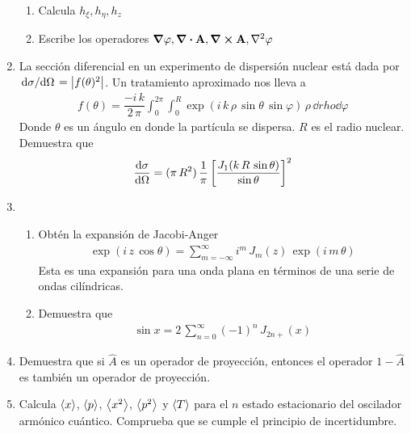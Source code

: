 \begin{enumerate}
\begin{enumerate}
    \item Calcula $h_{\xi}, h_{\eta}, h_{z}$
    \item Escribe los operadores $\grad{\varphi}, \div{\vb{A}}, \curl \vb{A}, \laplacian{\varphi}$
    \end{enumerate}
\item La sección diferencial en un experimento de dispersión nuclear está dada por $\dv*{\sigma}{\Omega} = \abs{f(\theta)^{2}}$. Un tratamiento aproximado nos lleva a
\begin{align*}
f(\theta) = \dfrac{- i \, k}{2 \, \pi} \int_{0}^{2 \pi} \int_{0}^{R} \exp(i \, k \, \rho \, \sin \theta \, \sin \varphi ) \,  \rho \, \dd{rho} \dd{\varphi}
\end{align*}
Donde $\theta$ es un ángulo en donde la partícula se dispersa. $R$ es el radio nuclear. Demuestra que
\begin{align*}
\dv{\sigma}{\Omega} = (\pi \, R^{2}) \, \dfrac{1}{\pi} \left[ \dfrac{J_{1} (k \, R \, \sin \theta)}{\sin \theta} \right]^{2}
\end{align*}
\item \begin{enumerate}
\item Obtén la expansión de Jacobi-Anger
\begin{align*}
\exp(i \, z \, \cos \theta) = \sum_{m=-\infty}^{\infty} i^{m} \, J_{m}(z) \, \exp(i \, m \, \theta)
\end{align*}
Esta es una expansión para una onda plana en términos de una serie de ondas cilíndricas.
\item Demuestra que
\begin{align*}
\sin x = 2 \, \sum_{n=0}^{\infty} (-1)^{n} \, J_{2n+} (x)
\end{align*}
\end{enumerate}
\item Demuestra que si $\hat{A}$ es un operador de proyección, entonces el operador $1 - \hat{A}$ es también un operador de proyección.
\item Calcula $\expval{x}$, $\expval{p}$, $\expval{x^{2}}$, $\expval{p^{2}}$ y $\expval{T}$ para el $n$ estado estacionario del oscilador armónico cuántico. Comprueba que se cumple el principio de incertidumbre.
\end{enumerate}
